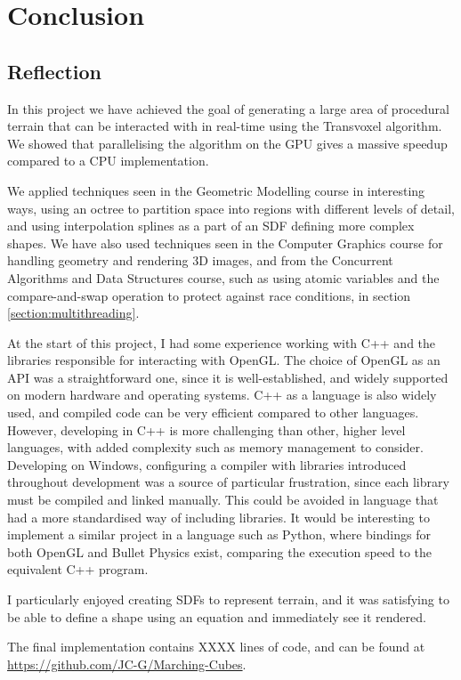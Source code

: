 \documentclass[11pt]{article}
\begin{document}
\section{Conclusion}
\subsection{Reflection}
In this project we have achieved the goal of generating a large area of procedural terrain that can be interacted with in real-time using the Transvoxel algorithm. We showed that parallelising the algorithm on the GPU gives a massive speedup compared to a CPU implementation.

We applied techniques seen in the Geometric Modelling course in interesting ways, using an octree to partition space into regions with different levels of detail, and using interpolation splines as a part of an SDF defining more complex shapes. 
We have also used techniques seen in the Computer Graphics course for handling geometry and rendering 3D images, and from the Concurrent Algorithms and Data Structures course, such as using atomic variables and the compare-and-swap operation to protect against race conditions, in section \ref{section:multithreading}.

At the start of this project, I had some experience working with C++ and the libraries responsible for interacting with OpenGL. The choice of OpenGL as an API was a straightforward one, since it is well-established, and widely supported on modern hardware and operating systems. C++ as a language is also widely used, and compiled code can be very efficient compared to other languages. However, developing in C++ is more challenging than other, higher level languages, with added complexity such as memory management to consider. Developing on Windows, configuring a compiler with libraries introduced throughout development was a source of particular frustration, since each library must be compiled and linked manually. This could be avoided in language that had a more standardised way of including libraries. It would be interesting to implement a similar project in a language such as Python, where bindings for both OpenGL and Bullet Physics exist, comparing the execution speed to the equivalent C++ program.

I particularly enjoyed creating SDFs to represent terrain, and it was satisfying to be able to define a shape using an equation and immediately see it rendered. 

The final implementation contains XXXX lines of code, and can be found at \url{https://github.com/JC-G/Marching-Cubes}.
\end{document}
